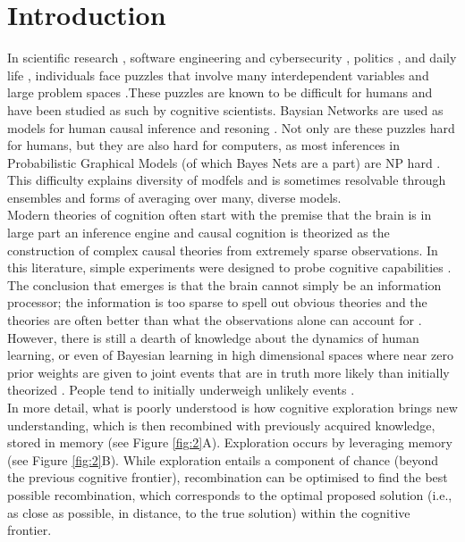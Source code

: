\section{Introduction}

In scientific research \cite{hisano2013challenges}, software engineering and cybersecurity \cite{littlewood1989predicting,maillart2017given}, politics \cite{clinton2014hard}, and daily life \cite{gerson1986hard}, individuals face puzzles that involve many interdependent variables and large problem spaces \cite{koller09, Pearl2009CMR}.These puzzles are known to be difficult for humans and have been studied as such by cognitive scientists. Baysian Networks are used as models for human causal inference and resoning \cite{bramley2015staying, castnerForthcoming, Griffiths2008, Pearl88, Spiegler2016, spiegler2015}. Not only are these puzzles hard for humans, but they are also hard for computers, as most inferences in Probabilistic Graphical Models (of which Bayes Nets are a part) are NP hard \cite{koller09}. This difficulty explains diversity of modfels and is sometimes resolvable through ensembles and forms of averaging over many, diverse models.\\ 

Modern theories of cognition often start with the premise that the brain is in large part an inference engine \cite{Tenenbaum06theory-basedbayesian} and causal cognition is theorized as the construction of complex causal theories from extremely sparse observations. In this literature, simple experiments were designed to probe cognitive capabilities \cite{tenenbaum2001structure}. The conclusion that emerges is that the brain cannot simply be an information processor; the information is too sparse to spell out obvious theories and the theories are often better than what the observations alone can account for \cite{ortoleva2012modeling, Hong04}.  \\

However, there is still a dearth of knowledge about the dynamics of human learning, or even of Bayesian learning in high dimensional spaces where near zero prior weights are given to joint events that are in truth more likely than initially theorized \cite{ortoleva2012modeling}. People tend to initially underweigh unlikely events \cite{taleb2007}.\\

In more detail, what is poorly understood is how cognitive exploration brings new understanding, which is then recombined with previously acquired knowledge, stored in memory (see Figure \ref{fig:2}A). Exploration occurs by leveraging memory (see Figure \ref{fig:2}B). While exploration entails a component of chance (beyond the previous cognitive frontier), recombination can be optimised to find the best possible recombination, which corresponds to the optimal proposed solution (i.e., as close as possible, in distance, to the true solution) within the cognitive frontier.\\

